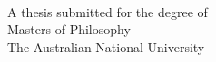 
\begin{titlepage}
  \enlargethispage{2cm}
  \begin{center}
    \makeatletter
    \Huge\textbf{\@title} \\[.4cm]
    \Huge\textbf{\thesisqualifier} \\[2.5cm]
    \huge\textbf{\@author} \\[9cm]
    \makeatother
    \LARGE A thesis submitted for the degree of \\
    Masters of Philosophy\\
    The Australian National University \\[2cm]
    \thismonth
  \end{center}
\end{titlepage}
